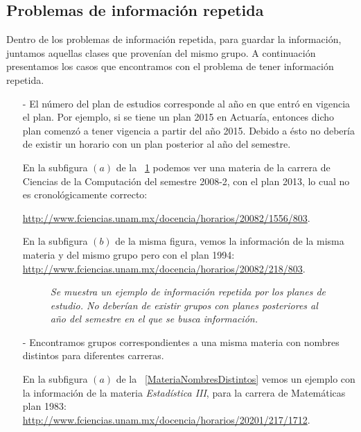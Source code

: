 \subsection{Problemas de información repetida}

Dentro de los problemas de información repetida, para guardar la información, juntamos aquellas clases que provenían del mismo grupo. A continuación presentamos los casos que encontramos con el problema de tener información repetida.

\begin{itemize}
\item[-] El número del plan de estudios corresponde al año en que entró en vigencia el plan. Por ejemplo, si se tiene un plan 2015 en Actuaría, entonces dicho plan comenzó a tener vigencia a partir del año 2015. Debido a ésto no debería de existir un horario con un plan posterior al año del semestre.

En la subfigura $(a)$ de la \figurename{~\ref{planRepetido}} podemos ver una materia de la carrera de Ciencias de la Computación del semestre 2008-2, con el plan 2013, lo cual no es cronológicamente correcto:

\url{http://www.fciencias.unam.mx/docencia/horarios/20082/1556/803}.

En la subfigura $(b)$ de la misma figura, vemos la información de la misma materia y del mismo grupo pero con el plan 1994: \url{http://www.fciencias.unam.mx/docencia/horarios/20082/218/803}.

\begin{figure}[H]
\centering
{} %
	\caption[\textit{Información repetida: Planes de estudio}]{\textit{Se muestra un ejemplo de información repetida por los planes de estudio. No deberían de existir grupos con planes posteriores al año del semestre en el que se busca información.}}\label{planRepetido}
\end{figure}

\item[-] Encontramos grupos correspondientes a una misma materia con nombres distintos para diferentes carreras.

En la subfigura $(a)$ de la \figurename{~\ref{MateriaNombresDistintos}} vemos un ejemplo con la información de la materia \textit{Estadística III}, para la carrera de Matemáticas plan 1983: \url{http://www.fciencias.unam.mx/docencia/horarios/20201/217/1712}.


\end{itemize}
